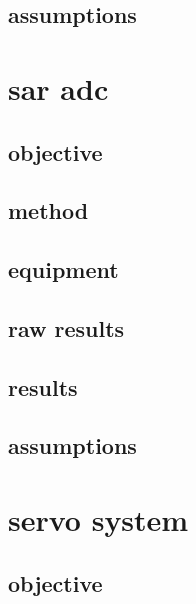 \documentclass[a4paper, 12pt, titlepage]{article}
\begin{document}
\subsection{assumptions} %


\section{sar adc} %

\subsection{objective} %


\subsection{method} %


\subsection{equipment} %


\subsection{raw results} %


\subsection{results} %


\subsection{assumptions} %



\section{servo system} %

\subsection{objective} %
\end{document}
